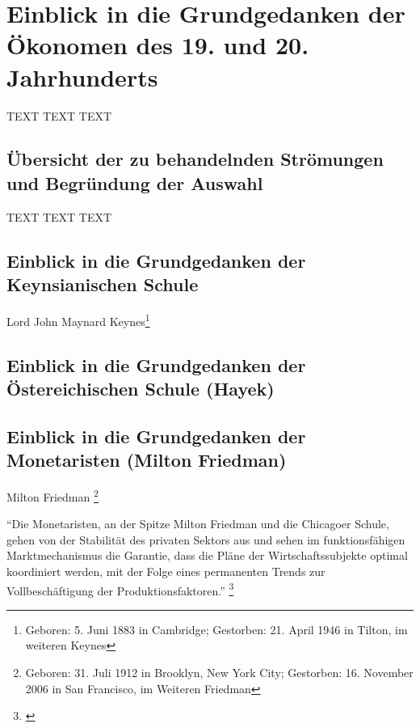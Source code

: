 \documentclass[
        onecolumn,
        a4paper,
        abstracton,
        parskip=half
        ,final
        ]{scrartcl}
\begin{document}
\clearpage









\section{Einblick in die Grundgedanken der {\"O}konomen des 19. und 20. Jahrhunderts}
  \label{sec3:stroemungen}
  TEXT TEXT TEXT


\subsection{{\"U}bersicht der zu behandelnden Str{\"o}mungen und Begr{\"u}ndung der Auswahl}

TEXT TEXT TEXT





\subsection{Einblick in die Grundgedanken der Keynsianischen Schule}

Lord John Maynard Keynes\footnote[14]{Geboren:  5. Juni 1883 in Cambridge; Gestorben: 21. April 1946 in Tilton, im weiteren Keynes}





\subsection{Einblick in die Grundgedanken der {\"O}stereichischen Schule (Hayek)}











\subsection{Einblick in die Grundgedanken der Monetaristen (Milton Friedman)}
Milton Friedman \footnote[16]{Geboren: 31. Juli 1912 in Brooklyn, New York City; Gestorben: 16. November 2006 in San Francisco, im Weiteren Friedman}



"`Die Monetaristen, an der Spitze Milton Friedman und die Chicagoer Schule,
gehen von der Stabilit{\"a}t des privaten Sektors aus und sehen im
funktionsf{\"a}higen Marktmechanismus die Garantie, dass die Pl{\"a}ne der
Wirtschaftssubjekte optimal koordiniert werden, mit der Folge eines
permanenten Trends zur Vollbesch{\"a}ftigung der Produktionsfaktoren."' \footnote[501]{\citep[Vgl.][S.210]{peters2000}}
\end{document}
